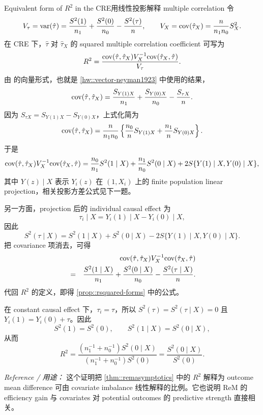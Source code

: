 \begin{exercisesolution}{Equivalent form of $R^2$ in the CRE}{用线性投影解释 multiple correlation}
令
\[
V_\tau=\textup{var}(\hat{\tau})
=\frac{S^2(1)}{n_1}+\frac{S^2(0)}{n_0}-\frac{S^2(\tau)}{n},
\qquad
V_X=\textup{cov}(\hat{\tau}_X)=\frac{n}{n_1n_0}S_X^2.
\]
在 CRE 下，$\hat{\tau}$ 对 $\hat{\tau}_X$ 的 squared multiple correlation coefficient 可写为
\[
R^2=\frac{\textup{cov}(\hat{\tau},\hat{\tau}_X)V_X^{-1}
\textup{cov}(\hat{\tau}_X,\hat{\tau})}{V_\tau}.
\]
由 \citet{Neyman:1923} 的向量形式，也就是 \cref{hw::vector-neyman1923} 中使用的结果，
\[
\textup{cov}(\hat{\tau},\hat{\tau}_X)
=\frac{S_{Y(1)X}}{n_1}+\frac{S_{Y(0)X}}{n_0}
-\frac{S_{\tau X}}{n}.
\]
因为 $S_{\tau X}=S_{Y(1)X}-S_{Y(0)X}$，上式化简为
\[
\textup{cov}(\hat{\tau},\hat{\tau}_X)
=\frac{n}{n_1n_0}
\left\{\frac{n_0}{n}S_{Y(1)X}+\frac{n_1}{n}S_{Y(0)X}\right\}.
\]
于是
\[
\textup{cov}(\hat{\tau},\hat{\tau}_X)V_X^{-1}
\textup{cov}(\hat{\tau}_X,\hat{\tau})
=\frac{n_0}{n_1}S^2(1\mid X)
+\frac{n_1}{n_0}S^2(0\mid X)
+2S\{Y(1)\mid X,Y(0)\mid X\},
\]
其中 $Y(z)\mid X$ 表示 $Y_i(z)$ 在 $(1,X_i)$ 上的 finite population linear projection，相关投影方差公式见下一题。

另一方面，projection 后的 individual causal effect 为
\[
\tau_i\mid X=Y_i(1)\mid X-Y_i(0)\mid X,
\]
因此
\[
S^2(\tau\mid X)
=S^2(1\mid X)+S^2(0\mid X)
-2S\{Y(1)\mid X,Y(0)\mid X\}.
\]
把 covariance 项消去，可得
\begin{eqnarray*}
&&\textup{cov}(\hat{\tau},\hat{\tau}_X)V_X^{-1}
\textup{cov}(\hat{\tau}_X,\hat{\tau})\\
&=&
\frac{S^2(1\mid X)}{n_1}
+\frac{S^2(0\mid X)}{n_0}
-\frac{S^2(\tau\mid X)}{n}.
\end{eqnarray*}
代回 $R^2$ 的定义，即得 \cref{prop::rsquared-forms} 中的公式。

在 constant causal effect 下，$\tau_i=\tau$，所以 $S^2(\tau)=S^2(\tau\mid X)=0$ 且 $Y_i(1)=Y_i(0)+\tau$。因此
\[
S^2(1)=S^2(0),\qquad S^2(1\mid X)=S^2(0\mid X),
\]
从而
\[
R^2=\frac{(n_1^{-1}+n_0^{-1})S^2(0\mid X)}
{(n_1^{-1}+n_0^{-1})S^2(0)}
=\frac{S^2(0\mid X)}{S^2(0)}.
\]

\emph{Reference / 用途：} 这个证明把 \cref{thm::remasymptotics} 中的 $R^2$ 解释为 outcome mean difference 可由 covariate imbalance 线性解释的比例。它也说明 ReM 的 efficiency gain 与 covariates 对 potential outcomes 的 predictive strength 直接相关。
\end{exercisesolution}

